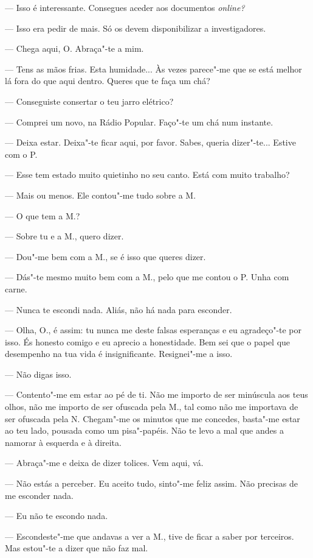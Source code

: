 --- Isso é interessante. Consegues aceder aos documentos
\emph{online?}

--- Isso era pedir de mais. Só os devem disponibilizar a investigadores.

--- Chega aqui, O. Abraça"-te a mim.

--- Tens as mãos frias. Esta humidade... Às vezes parece"-me que se está
melhor lá fora do que aqui dentro. Queres que te faça um
chá?

--- Conseguiste consertar o teu jarro elétrico?

--- Comprei um novo, na Rádio Popular. Faço"-te um chá num instante.

--- Deixa estar. Deixa"-te ficar aqui, por favor. Sabes, queria
  dizer"-te... Estive com o P.

--- Esse tem estado muito quietinho no seu canto. Está com muito trabalho?

--- Mais ou menos. Ele contou"-me tudo sobre a M.

--- O que tem a M.?

--- Sobre tu e a M., quero dizer.

--- Dou"-me bem com a M., se é isso que queres dizer.

--- Dás"-te mesmo muito bem com a M., pelo que me contou o P. Unha com
  carne.

--- Nunca te escondi nada. Aliás, não há nada para esconder.

--- Olha, O., é assim: tu nunca me deste falsas esperanças e eu
  agradeço"-te por isso. És honesto comigo e eu aprecio a honestidade.
  Bem sei que o papel que desempenho na tua vida é insignificante.
  Resignei"-me a isso.

--- Não digas isso.

--- Contento"-me em estar ao pé de ti. Não me importo de
ser minúscula aos teus olhos, não me importo de ser ofuscada pela M.,
tal como não me importava de ser ofuscada pela N. Chegam"-me os minutos
que me concedes, basta"-me estar ao teu lado, pousada como um
pisa"-papéis. Não te levo a mal que andes a namorar à esquerda e à
direita.

--- Abraça"-me e deixa de dizer tolices. Vem aqui, vá.

--- Não estás a perceber. Eu aceito tudo, sinto"-me feliz assim. Não
  precisas de me esconder nada.

--- Eu não te escondo nada.

--- Escondeste"-me que andavas a ver a M., tive de ficar a saber por
  terceiros. Mas estou"-te a dizer que não faz mal.

